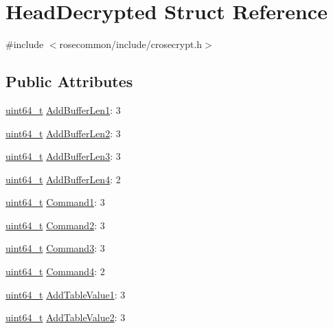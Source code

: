 \hypertarget{structHeadDecrypted}{}\section{Head\+Decrypted Struct Reference}
\label{structHeadDecrypted}


{\ttfamily \#include $<$rosecommon/include/crosecrypt.\+h$>$}

\subsection*{Public Attributes}
\begin{DoxyCompactItemize}
\item 
\hyperlink{stdint_8h_aec6fcb673ff035718c238c8c9d544c47}{uint64\+\_\+t} \hyperlink{structHeadDecrypted_a6e2d7d7d03db6ac7b8ed153a4819f449}{Add\+Buffer\+Len1}\+: 3
\item 
\hyperlink{stdint_8h_aec6fcb673ff035718c238c8c9d544c47}{uint64\+\_\+t} \hyperlink{structHeadDecrypted_ab8a0200f54f3efee5aa20fad048185b0}{Add\+Buffer\+Len2}\+: 3
\item 
\hyperlink{stdint_8h_aec6fcb673ff035718c238c8c9d544c47}{uint64\+\_\+t} \hyperlink{structHeadDecrypted_a3d6977af8c7a51b0210f8e81a22ec943}{Add\+Buffer\+Len3}\+: 3
\item 
\hyperlink{stdint_8h_aec6fcb673ff035718c238c8c9d544c47}{uint64\+\_\+t} \hyperlink{structHeadDecrypted_adac2d7f19544c53a47618d5fca061311}{Add\+Buffer\+Len4}\+: 2
\item 
\hyperlink{stdint_8h_aec6fcb673ff035718c238c8c9d544c47}{uint64\+\_\+t} \hyperlink{structHeadDecrypted_ac4b2a4b0a255cac2213d13395ba8868b}{Command1}\+: 3
\item 
\hyperlink{stdint_8h_aec6fcb673ff035718c238c8c9d544c47}{uint64\+\_\+t} \hyperlink{structHeadDecrypted_afdb65417603e70d7605dc23a7f381dad}{Command2}\+: 3
\item 
\hyperlink{stdint_8h_aec6fcb673ff035718c238c8c9d544c47}{uint64\+\_\+t} \hyperlink{structHeadDecrypted_a6c59e5934519350bd93d86a7137779aa}{Command3}\+: 3
\item 
\hyperlink{stdint_8h_aec6fcb673ff035718c238c8c9d544c47}{uint64\+\_\+t} \hyperlink{structHeadDecrypted_a562be0121cc5323faaafb3eb596a6854}{Command4}\+: 2
\item 
\hyperlink{stdint_8h_aec6fcb673ff035718c238c8c9d544c47}{uint64\+\_\+t} \hyperlink{structHeadDecrypted_aa0d9ab662e9eea16ed24b7fa3c794c91}{Add\+Table\+Value1}\+: 3
\item 
\hyperlink{stdint_8h_aec6fcb673ff035718c238c8c9d544c47}{uint64\+\_\+t} \hyperlink{structHeadDecrypted_a4ce917085f4473084cfb6a7afcecf5f7}{Add\+Table\+Value2}\+: 3

\end{DoxyCompactItemize}
